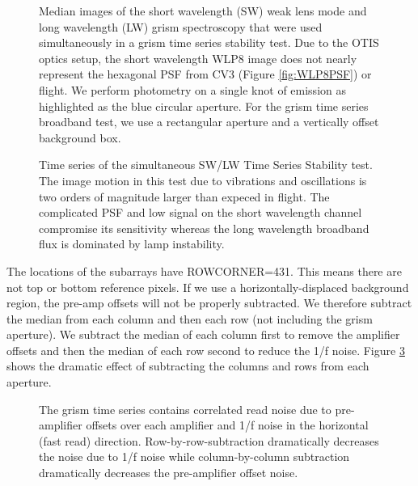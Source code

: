 \documentclass{aastex62}
\begin{document}
\begin{figure}
\caption{Median images of the short wavelength (SW) weak lens mode and long wavelength (LW) grism spectroscopy that were used simultaneously in a grism time series stability test.
Due to the OTIS optics setup, the short wavelength WLP8 image does not nearly represent the hexagonal PSF from CV3 (Figure \ref{fig:WLP8PSF}) or flight.
We perform photometry on a single knot of emission as highlighted as the blue circular aperture.
For the grism time series broadband test, we use a rectangular aperture and a vertically offset background box.
}\label{fig:otisPSFs}
\end{figure}

\begin{figure}
\caption{Time series of the simultaneous SW/LW Time Series Stability test.
The image motion in this test due to vibrations and oscillations is two orders of magnitude larger than expeced in flight.
The complicated PSF and low signal on the short wavelength channel compromise its sensitivity whereas the long wavelength broadband flux is dominated by lamp instability.
}\label{fig:otisLWSWtser}
\end{figure}


The locations of the subarrays have ROWCORNER=431.
This means there are not top or bottom reference pixels.
If we use a horizontally-displaced background region, the pre-amp offsets will not be properly subtracted.
We therefore subtract the median from each column and then each row (not including the grism aperture).
We subtract the median of each column first to remove the amplifier offsets and then the median of each row second to reduce the 1/f noise.
Figure \ref{fig:otisLWcolrowSub} shows the dramatic effect of subtracting the columns and rows from each aperture.

\begin{figure}
\caption{The grism time series contains correlated read noise due to pre-amplifier offsets over each amplifier and 1/f noise in the horizontal (fast read) direction.
Row-by-row-subtraction dramatically decreases the noise due to 1/f noise while column-by-column subtraction dramatically decreases the pre-amplifier offset noise.
}\label{fig:otisLWcolrowSub}
\end{figure}
\end{document}
